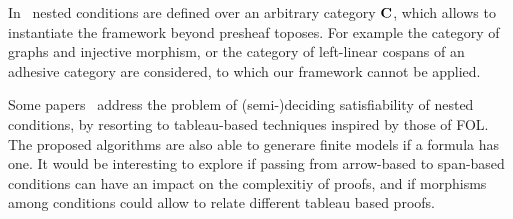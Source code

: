 In~\cite{bchk:conditional-reactive-systems,sksclo:coinductive-techniques-for-satisfiability} nested conditions are defined over an arbitrary category $\mathbf{C}$, which allows to instantiate the framework beyond presheaf toposes. For example the category of graphs and injective morphism, or the category of left-linear cospans of an adhesive category are considered, to which our framework cannot be applied.

Some papers~\cite{lo:tableau-graph-properties,slo:model-generation,sksclo:coinductive-techniques-for-satisfiability} address the problem of (semi-)deciding satisfiability of nested conditions, by resorting to tableau-based techniques inspired by those of FOL. The proposed algorithms are also able to generare finite models if a formula has one.
It would be interesting to explore if passing from arrow-based to span-based conditions can have an impact on  the complexitiy of proofs, and if morphisms among conditions could allow to relate different tableau based proofs.
